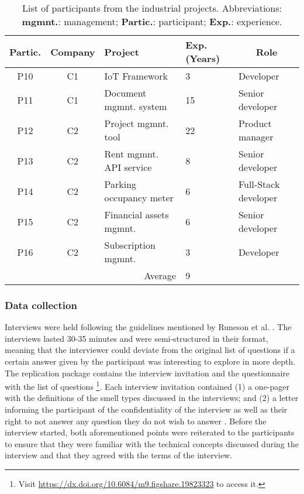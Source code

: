 \begin{table}[]
    \centering
    \footnotesize
    \caption{List of participants from the industrial projects. Abbreviations: \textbf{mgmnt.}: management; \textbf{Partic.}: participant; \textbf{Exp.}: experience.}
    \label{c6:tab:industrial-participants}
    \begin{tabular}{@{}ccm{2cm}m{0.5cm}l@{}}
    \toprule
    \textbf{Partic.} & \textbf{Company} & \textbf{Project} & \textbf{Exp. (Years)} & \multicolumn{1}{c}{\textbf{Role}} \\ \midrule
    P10 & C1 & IoT Framework & 3 & Developer \\ %
    P11 & C1 & Document mgmnt. system & 15 & Senior developer \\ %
    P12 & C2 & Project mgmnt. tool & 22 & Product manager\\ %
    P13 & C2 & Rent mgmnt. API service & 8 & Senior developer \\ %
    P14 & C2 & Parking occupancy meter & 6 & Full-Stack developer \\ %
    P15 & C2 & Financial assets mgmnt. & 6 & Senior developer \\ %
    P16 & C2 & Subscription mgmnt. & 3 & Developer \\ \midrule %
    \multicolumn{3}{r}{Average} & 9 &  \\ \bottomrule
    \end{tabular}
\end{table}

\subsubsection{Data collection}
Interviews were held following the guidelines mentioned by Runeson et al. \cite{Runeson2012}.
The interviews lasted 30-35 minutes and were semi-structured in their format, meaning that the interviewer could deviate from the original list of questions if a certain answer given by the participant was interesting to explore in more depth. The replication package contains the interview invitation and the questionnaire with the list of questions \footnote{Visit \url{https://dx.doi.org/10.6084/m9.figshare.19823323} to access it.}.
Each interview invitation contained (1) a one-pager with the definitions of the smell types discussed in the interviews; and (2) a letter informing the participant of the confidentiality of the interview as well as their right to not answer any question they do not wish to answer \cite{Runeson2012}.
Before the interview started, both aforementioned points were reiterated to the participants to ensure that they were familiar with the technical concepts discussed during the interview and that they agreed with the terms of the interview.
 
